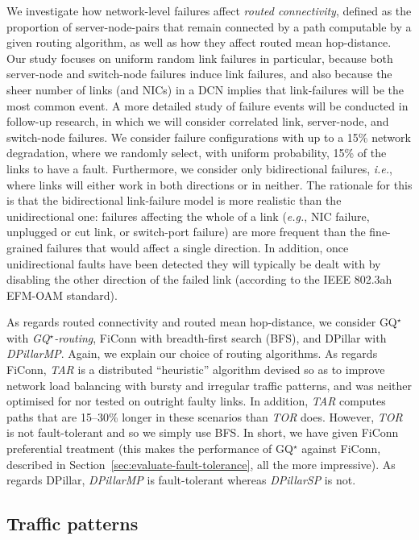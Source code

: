 \documentclass[]{amsart}
\begin{document}
We investigate how network-level failures affect \emph{routed connectivity}, defined as the proportion of server-node-pairs that remain connected by a path computable by a given routing algorithm, as well as how they affect routed mean hop-distance.  Our study focuses on uniform random link failures in particular, because both server-node and switch-node failures induce link failures, and also because the sheer number of links (and NICs) in a DCN implies that link-failures will be the most common event.  A more detailed study of failure events will be conducted in follow-up research, in which we will consider correlated link, server-node, and switch-node failures.  We consider failure configurations with up to a 15\% network degradation, where we randomly select, with uniform probability, 15\% of the links to have a fault.  Furthermore, we consider only bidirectional failures, \emph{i.e.\/}, where links will either work in both directions or in neither.  The rationale for this is that the bidirectional link-failure model is more realistic than the unidirectional one: failures affecting the whole of a link (\emph{e.g.\/}, NIC failure, unplugged or cut link, or switch-port failure) are more frequent than the fine-grained failures that would affect a single direction. In addition, once unidirectional faults have been detected they will typically be dealt with by disabling the other direction of the failed link (according to the IEEE 802.3ah EFM-OAM standard). 

As regards routed connectivity and routed mean hop-distance, we consider GQ$^\star$ with \emph{GQ$^\star$-routing\/}, FiConn with breadth-first search (BFS), and DPillar with \emph{DPillarMP\/}. Again, we explain our choice of routing algorithms. As regards FiConn, \emph{TAR\/} is a distributed ``heuristic'' algorithm devised so as to improve network load balancing with bursty and irregular traffic patterns, and was neither optimised for nor tested on outright faulty links.  In addition, \emph{TAR\/}
computes paths that are 15--30\% longer in these scenarios than \emph{TOR\/} does. However, \emph{TOR\/} is not fault-tolerant and so we simply use BFS. In short, we have given FiConn preferential treatment (this makes the performance of GQ$^\star$ against FiConn, described in Section~\ref{sec:evaluate-fault-tolerance}, all the more impressive). As regards DPillar, \emph{DPillarMP\/} is fault-tolerant whereas \emph{DPillarSP\/} is not.


\subsection{Traffic patterns}
\label{sec:traffic-patterns}
\end{document}

